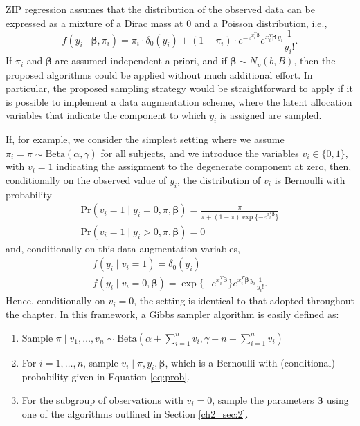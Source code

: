 ZIP regression assumes that the distribution of the observed data can be expressed as a mixture of a Dirac mass at 0 and a Poisson distribution, i.e.,
$$ f(y_i \mid \bm{\beta}, \pi_i) = \pi_i \cdot \delta_0(y_i) + (1-\pi_i) \cdot e^{-e^{x_i^T\bm{\beta}}} e^{x_i^T\bm{\beta}\, y_i} \frac{1}{y_i!}.$$
If $\pi_i$ and $\bm{\beta}$ are assumed independent a priori, and if $\bm{\beta} \sim N_p(b,B)$, then the proposed algorithms could be applied without much additional effort.
In particular, the proposed sampling strategy would be straightforward to apply if it is possible to implement a data augmentation scheme, where the latent allocation variables that indicate the component to which $y_i$ is assigned are sampled. 

If, for example, we consider the simplest setting where we assume $\pi_i = \pi \sim \mathrm{Beta}(\alpha,\gamma)$ for all subjects, and we introduce the variables $v_i\in\{0,1\}$, with $v_i = 1$ indicating the assignment to the degenerate component at zero, then, conditionally on the observed value of $y_i$, the distribution of $v_i$ is Bernoulli with probability
\begin{equation}
\begin{gathered}
\mathrm{Pr}(v_i = 1 \mid y_i=0, \pi, \bm{\beta}) =  \frac{\pi}{\pi + (1-\pi) \exp\{-e^{x_i^T\bm{\beta}}\}} \\
\mathrm{Pr}(v_i = 1 \mid y_i>0, \pi, \bm{\beta}) =  0
\end{gathered}
\label{eq:prob}
\end{equation}
and, conditionally on this data augmentation variables,
\begin{equation*}
\begin{gathered}
f(y_i \mid v_i = 1) = \delta_0(y_i) \\
f(y_i \mid v_i = 0, \bm{\beta}) = \exp\{-e^{x_i^T\bm{\beta}}\}e^{x_i^T\bm{\beta}\, y_i}\frac{1}{y_i!}.
\end{gathered}
\end{equation*}
Hence, conditionally on $v_i = 0$, the setting is identical to that adopted throughout the chapter.
In this framework, a Gibbs sampler algorithm is easily defined as:
\begin{enumerate}
	\item Sample $\pi\mid v_1,\dots,v_n \sim \mathrm{Beta}(\alpha + \sum_{i=1}^{n} v_i, \gamma + n - \sum_{i=1}^{n} v_i)$
	\item For $i = 1,\dots,n$, sample $v_i\mid \pi, y_i, \bm{\beta}$, which is a Bernoulli with (conditional) probability given in Equation \eqref{eq:prob}.
	\item For the subgroup of observations with $v_i = 0$, sample the parameters $\bm{\beta}$ using one of the algorithms outlined in Section \ref{ch2_sec:2}. 
\end{enumerate}
